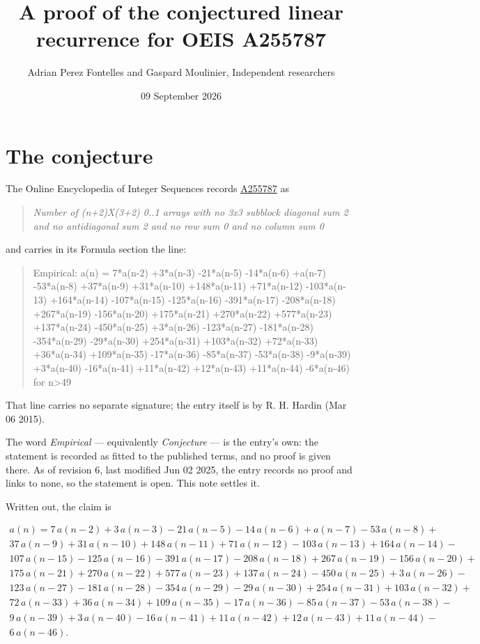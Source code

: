 \documentclass[11pt]{article}
\title{A proof of the conjectured linear recurrence for OEIS A255787}
\author{Adrian Perez Fontelles and Gaspard Moulinier, Independent researchers}
\date{09 September 2026}
\theoremstyle{definition}
\begin{document}
\maketitle
\section{The conjecture}

The Online Encyclopedia of Integer Sequences records \href{https://oeis.org/A255787}{A255787} as

\begin{quote}\itshape Number of (n+2)X(3+2) 0..1 arrays with no 3x3 subblock diagonal sum 2 and no antidiagonal sum 2 and no row sum 0 and no column sum 0\end{quote}

and carries in its Formula section the line:

\begin{quote}\ttfamily Empirical: a(n) = 7*a(n-2) +3*a(n-3) -21*a(n-5) -14*a(n-6) +a(n-7) -53*a(n-8) +37*a(n-9) +31*a(n-10) +148*a(n-11) +71*a(n-12) -103*a(n-13) +164*a(n-14) -107*a(n-15) -125*a(n-16) -391*a(n-17) -208*a(n-18) +267*a(n-19) -156*a(n-20) +175*a(n-21) +270*a(n-22) +577*a(n-23) +137*a(n-24) -450*a(n-25) +3*a(n-26) -123*a(n-27) -181*a(n-28) -354*a(n-29) -29*a(n-30) +254*a(n-31) +103*a(n-32) +72*a(n-33) +36*a(n-34) +109*a(n-35) -17*a(n-36) -85*a(n-37) -53*a(n-38) -9*a(n-39) +3*a(n-40) -16*a(n-41) +11*a(n-42) +12*a(n-43) +11*a(n-44) -6*a(n-46) for n>49\end{quote}

That line carries no separate signature; the entry itself is by R. H. Hardin (Mar 06 2015).

The word {\itshape Empirical} --- equivalently {\itshape Conjecture} --- is the entry's own: the statement is recorded as fitted to the published terms, and no proof is given there. As of revision 6, last modified Jun 02 2025, the entry records no proof and links to none, so the statement is open. This note settles it.

Written out, the claim is

\begin{multline*} a(n) = 7\,a(n-2) + 3\,a(n-3) - 21\,a(n-5) - 14\,a(n-6) + a(n-7) - 53\,a(n-8) + \\ 37\,a(n-9) + 31\,a(n-10) + 148\,a(n-11) + 71\,a(n-12) - 103\,a(n-13) + 164\,a(n-14) - \\ 107\,a(n-15) - 125\,a(n-16) - 391\,a(n-17) - 208\,a(n-18) + 267\,a(n-19) - 156\,a(n-20) + \\ 175\,a(n-21) + 270\,a(n-22) + 577\,a(n-23) + 137\,a(n-24) - 450\,a(n-25) + 3\,a(n-26) - \\ 123\,a(n-27) - 181\,a(n-28) - 354\,a(n-29) - 29\,a(n-30) + 254\,a(n-31) + 103\,a(n-32) + \\ 72\,a(n-33) + 36\,a(n-34) + 109\,a(n-35) - 17\,a(n-36) - 85\,a(n-37) - 53\,a(n-38) - \\ 9\,a(n-39) + 3\,a(n-40) - 16\,a(n-41) + 11\,a(n-42) + 12\,a(n-43) + 11\,a(n-44) - \\ 6\,a(n-46). \end{multline*}
\end{document}
